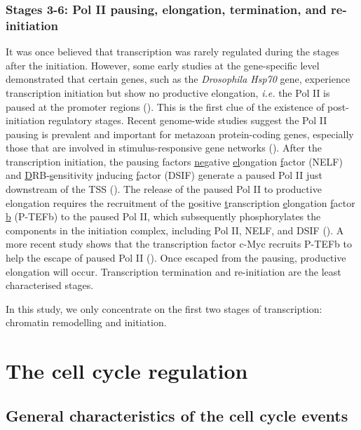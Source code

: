 \subsubsection{Stages 3-6: Pol II pausing, elongation, termination, and re-initiation}

It was once believed that transcription was rarely regulated during the stages after the initiation. However, some early studies at the gene-specific level demonstrated that certain genes, such as the \textit{Drosophila Hsp70} gene, experience transcription initiation but show no productive elongation, \textit{i.e.} the Pol II is paused at the promoter regions (\cite{rougvie1988the}). This is the first clue of the existence of post-initiation regulatory stages. Recent genome-wide studies suggest the Pol II pausing is prevalent and important for metazoan protein-coding genes, especially those that are involved in stimulus-responsive gene networks (\cite{guenther2007a,gilchrist2012regulating}). After the transcription initiation, the pausing factors \underline{ne}gative \underline{el}ongation \underline{f}actor (NELF) and \underline{D}RB-\underline{s}ensitivity \underline{i}nducing \underline{f}actor (DSIF) generate a paused Pol II just downstream of the TSS (\cite{yamagata2008arginine}). The release of the paused Pol II to productive elongation requires the recruitment of the \underline{p}ositive \underline{t}ranscription \underline{e}longation \underline{f}actor \underline{b} (P-TEFb) to the paused Pol II, which subsequently phosphorylates the components in the initiation complex, including Pol II, NELF, and DSIF (\cite{core2008transcription}). A more recent study shows that the transcription factor c-Myc recruits P-TEFb to help the escape of paused Pol II (\cite{rahl2010c-myc}). Once escaped from the pausing, productive elongation will occur. Transcription termination and re-initiation are the least characterised stages.

In this study, we only concentrate on the first two stages of transcription: chromatin remodelling and initiation.

\section{The cell cycle regulation}

\subsection{General characteristics of the cell cycle events}


